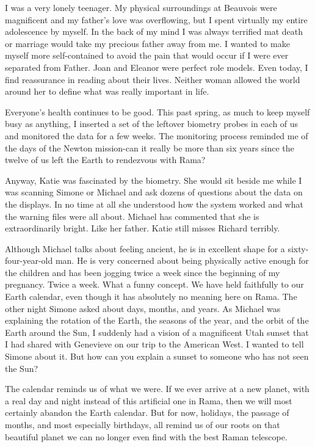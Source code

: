 \documentclass[]{article}
\begin{document}
I was a very lonely teenager. My physical surroundings at Beauvois were magnificent and my father’s love was overflowing, but I spent virtually my entire adolescence by myself. In the back of my mind I was always terrified mat death or marriage would take my precious father away from me. I wanted to make myself more self-contained to avoid the pain that would occur if I were ever separated from Father. Joan and Eleanor were perfect role models. Even today, I find reassurance in reading about their lives. Neither woman allowed the world around her to define what was really important in life.

Everyone’s health continues to be good. This past spring, as much to keep myself busy as anything, I inserted a set of the leftover biometry probes in each of us and monitored the data for a few weeks. The monitoring process reminded me of the days of the Newton mission-can it really be more than six years since the twelve of us left the Earth to rendezvous with Rama?

Anyway, Katie was fascinated by the biometry. She would sit beside me while I was scanning Simone or Michael and ask dozens of questions about the data on the displays. In no time at all she understood how the system worked and what the warning files were all about. Michael has commented that she is extraordinarily bright. Like her father. Katie still misses Richard terribly.

Although Michael talks about feeling ancient, he is in excellent shape for a sixty-four-year-old man. He is very concerned about being physically active enough for the children and has been jogging twice a week since the beginning of my pregnancy. Twice a week. What a funny concept. We have held faithfully to our Earth calendar, even though it has absolutely no meaning here on Rama. The other night Simone asked about days, months, and years. As Michael was explaining the rotation of the Earth, the seasons of the year, and the orbit of the Earth around the Sun, I suddenly had a vision of a magnificent Utah sunset that I had shared with Genevieve on our trip to the American West. I wanted to tell Simone about it. But how can you explain a sunset to someone who has not seen the Sun?

The calendar reminds us of what we were. If we ever arrive at a new planet, with a real day and night instead of this artificial one in Rama, then we will most certainly abandon the Earth calendar. But for now, holidays, the passage of months, and most especially birthdays, all remind us of our roots on that beautiful planet we can no longer even find with the best Raman telescope.
\end{document}
